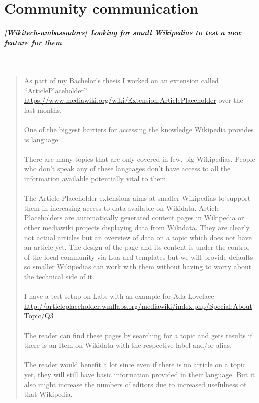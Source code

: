 \chapter{Community communication} \label{community}

\paragraph{[Wikitech-ambassadors] Looking for small Wikipedias to test a new feature for them} ~\\
\begin{quote}
As part of my Bachelor’s thesis I worked on an extension called “ArticlePlaceholder” \url{https://www.mediawiki.org/wiki/Extension:ArticlePlaceholder} over the last months. \\
\\
One of the biggest barriers for accessing the knowledge Wikipedia provides is language. \\
\\
There are many topics that are only covered in few, big Wikipedias. People who don’t speak any of these languages don’t have access to all the information available potentially vital to them. \\
\\
The Article Placeholder extensions aims at smaller Wikipedias to support them in increasing access to data available on Wikidata. Article Placeholders are automatically generated content pages in Wikipedia or other mediawiki projects displaying data from Wikidata. They are clearly not actual articles but an overview of data on a topic which does not have an article yet. The design of the page and its content is under the control of the local community via Lua and templates but we will provide defaults so smaller Wikipedias can work with them without having to worry about the technical side of it. \\
\\
I have a test setup on Labs with an example for Ada Lovelace \url{http://articleplaceholder.wmflabs.org/mediawiki/index.php/Special:AboutTopic/Q3} \\
\\
The reader can find these pages by searching for a topic and gets results if there is an Item on Wikidata with the respective label and/or alias. \\
\\
The reader would benefit a lot since even if there is no article on a topic yet, they will still have basic information provided in their language. But it also might increase the numbers of editors due to increased usefulness of that Wikipedia. \\

\end{quote}

